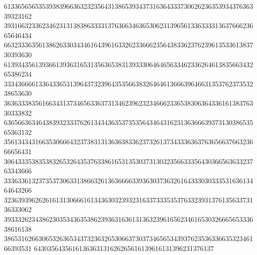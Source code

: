 61336565653539383966363232356431386539343731636433373062623635393437636339323162
39316632336234623131383863333137636634636530623139656133633331363766623665646434
66323336356138626330343461643961633262336662356438336237623961353361383730393630
61393435613936613936316531356365383139333064646563346233626461383566343265386234
33343666613364336531396437323964353566383264646136663964663135376237353238653630
36363338356166343137346563363731346239623234666233653830636433616138376330333832
63656636346438393233376261343436353735356434643162313636663937313038653565363132
35613434316635306664323738313136363833623732613734333636376365663766323666656431
30643335383538326532643537633861653135303731303235663335643036656363323763343666
33363361323735373063313866326136366663393630373632616433303033353163613464643266
32363939626261613130666161343630323932316337333535376332393137613563373136333062
39333262343862303534363538623936316361313632396165623461653032666565333638616138
38653162663065326365343732363265306637303734656534393762353633663532346166393531
6430356435616136363131626265616139616131396231376137
